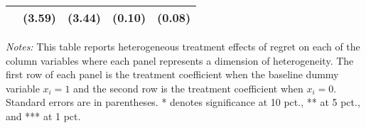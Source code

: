 \begin{table}[h]
{\begin{threeparttable}
\begin{tabular}{l*{4}{c}}
                &   (3.59)&   (3.44)&   (0.10)&   (0.08)\\
\bottomrule \end{tabular} \begin{tablenotes}[flushleft] \footnotesize \item \emph{Notes:} This table reports heterogeneous treatment effects of regret on each of the column variables where each panel represents a dimension of heterogeneity. The first row of each panel is the treatment coefficient when the baseline dummy variable \(x_i = 1\) and the second row is the treatment coefficient when \(x_i = 0\). Standard errors are in parentheses. * denotes significance at 10 pct., ** at 5 pct., and *** at 1 pct. \end{tablenotes} \end{threeparttable} } \end{table}
